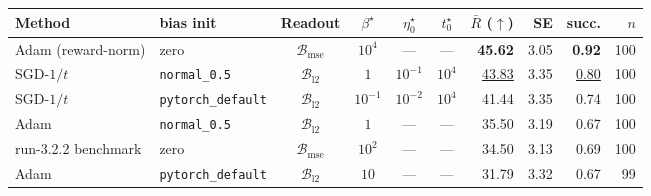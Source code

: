 \begin{tabular}{@{}>{\raggedright\arraybackslash}p{3.4cm} l c c c c r r r r@{}}
\toprule
\textbf{Method} & \textbf{bias init} & \textbf{Readout} & \textbf{$\beta^\star$} & \textbf{$\eta_0^\star$} & \textbf{$t_0^\star$} & \textbf{$\bar{R}$ ($\uparrow$)} & \textbf{SE} & \textbf{succ.} & \textbf{$n$} \\
\midrule
Adam (reward-norm) & zero & $\mathcal{B}_{\mathrm{mse}}$ & $10^{4}$ & --- & --- & \textbf{45.62} & 3.05 & \textbf{0.92} & 100 \\
SGD-$1/t$ & \texttt{normal\_0.5} & $\mathcal{B}_{\mathrm{l2}}$ & $1$ & $10^{-1}$ & $10^{4}$ & \underline{43.83} & 3.35 & \underline{0.80} & 100 \\
SGD-$1/t$ & \texttt{pytorch\_\allowbreak default} & $\mathcal{B}_{\mathrm{l2}}$ & $10^{-1}$ & $10^{-2}$ & $10^{4}$ & 41.44 & 3.35 & 0.74 & 100 \\
Adam & \texttt{normal\_0.5} & $\mathcal{B}_{\mathrm{l2}}$ & $1$ & --- & --- & 35.50 & 3.19 & 0.67 & 100 \\
run-3.2.2 benchmark & zero & $\mathcal{B}_{\mathrm{mse}}$ & $10^{2}$ & --- & --- & 34.50 & 3.13 & 0.69 & 100 \\
Adam & \texttt{pytorch\_\allowbreak default} & $\mathcal{B}_{\mathrm{l2}}$ & $10$ & --- & --- & 31.79 & 3.32 & 0.67 & 99 \\
\bottomrule
\end{tabular}
